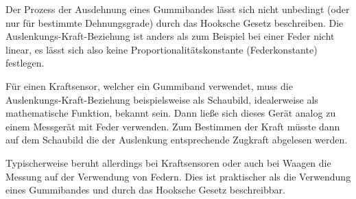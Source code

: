 \documentclass[a4paper, 12pt]{article}
\begin{document}
Der Prozess der Ausdehnung eines Gummibandes lässt sich nicht unbedingt (oder nur für bestimmte Dehnungsgrade) durch das Hooksche Gesetz beschreiben.
Die Auslenkungs-Kraft-Beziehung ist anders als zum Beispiel bei einer Feder nicht linear, es lässt sich also keine Proportionalitätskonstante (Federkonstante) festlegen.

Für einen Kraftsensor, welcher ein Gummiband verwendet, muss die Auslenkungs-Kraft-Beziehung beispielsweise als Schaubild, idealerweise als mathematische Funktion, bekannt sein. 
Dann ließe sich dieses Gerät analog zu einem Messgerät mit Feder verwenden. 
Zum Bestimmen der Kraft müsste dann auf dem Schaubild die der Auslenkung entsprechende Zugkraft abgelesen werden.

Typischerweise beruht allerdings bei Kraftsensoren oder auch bei Waagen die Messung auf der Verwendung von Federn. 
Dies ist praktischer als die Verwendung eines Gummibandes und durch das Hooksche Gesetz beschreibbar.
\end{document}
